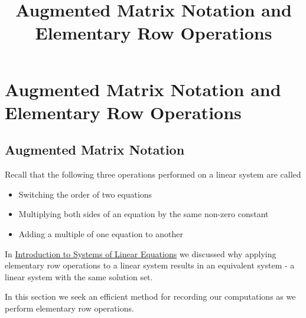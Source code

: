 \documentclass{ximera}
\title{Augmented Matrix Notation and Elementary Row Operations} \license{CC BY-NC-SA 4.0}
\begin{document}
\begin{abstract}
 \end{abstract}
\maketitle

\section*{Augmented Matrix Notation and Elementary Row Operations}

\subsection*{Augmented Matrix Notation}

Recall that the following three operations performed on a linear system are called 
\begin{itemize}
\item Switching the order of two equations
\item Multiplying both sides of an equation by the same non-zero constant
\item Adding a multiple of one equation to another
\end{itemize}


In \href{https://ximera.osu.edu/oerlinalg/LinearAlgebra/SYS-0010/main}{Introduction to Systems of Linear Equations} we discussed why applying elementary row operations to a linear system results in an equivalent system - a linear system with the same solution set.

In this section we seek an efficient method for recording our computations as we perform elementary row operations. 
\end{document}
